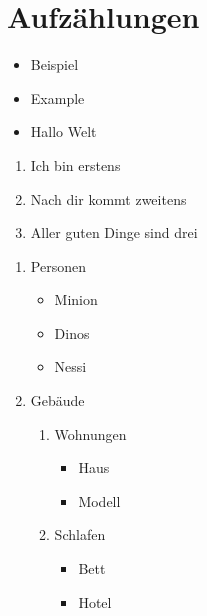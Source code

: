 
\chapter{Aufzählungen}
    \begin{itemize}                                %
        \item Beispiel                            %
        \item Example
        \item Hallo Welt
    \end{itemize}                                %

    \begin{enumerate}                            %
        \item Ich bin erstens                    %
        \item Nach dir kommt zweitens
        \item Aller guten Dinge sind drei
    \end{enumerate}                                %

    \begin{enumerate}
        \item Personen
        \begin{itemize}
            \item Minion
            \item Dinos
            \item Nessi
        \end{itemize}
        \item Gebäude
        \begin{enumerate}
            \item Wohnungen
            \begin{itemize}
                \item Haus
                \item Modell
            \end{itemize}
            \item Schlafen
            \begin{itemize}
                \item Bett
                \item Hotel
            \end{itemize}
        \end{enumerate}
    \end{enumerate}